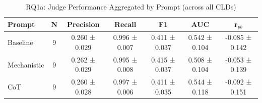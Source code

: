 \begin{table}[htbp]
\centering
\caption{RQ1a: Judge Performance Aggregated by Prompt (across all CLDs)}
\label{tab:rq1a_by_prompt}
\begin{tabular}{lcccccc}
\toprule
\textbf{Prompt} & \textbf{N} & \textbf{Precision} & \textbf{Recall} & \textbf{F1} & \textbf{AUC} & \textbf{r$_{pb}$} \\
\midrule
Baseline & 9 & 0.260 ± 0.029 & 0.996 ± 0.007 & 0.411 ± 0.037 & 0.542 ± 0.104 & -0.085 ± 0.142 \\
Mechanistic & 9 & 0.262 ± 0.029 & 0.995 ± 0.008 & 0.415 ± 0.037 & 0.508 ± 0.104 & -0.053 ± 0.139 \\
CoT & 9 & 0.260 ± 0.028 & 0.997 ± 0.006 & 0.411 ± 0.035 & 0.544 ± 0.118 & -0.092 ± 0.151 \\
\bottomrule
\end{tabular}
\end{table}